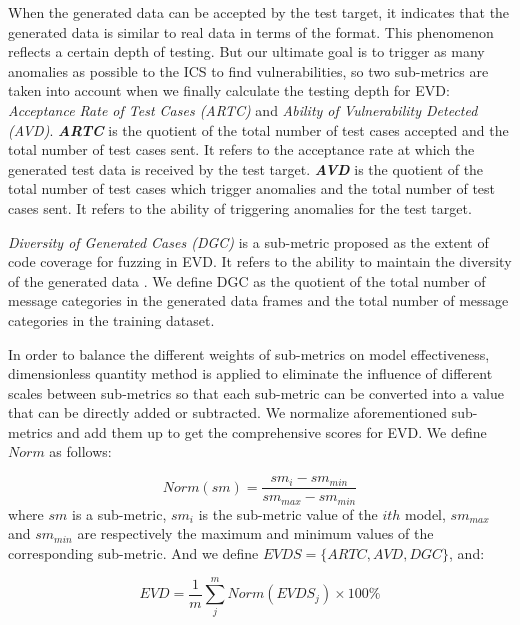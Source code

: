 When the generated data can be accepted by the test target, it indicates that the generated data is similar to real data in terms of the format. This phenomenon reflects a certain depth of testing. But our ultimate goal is to trigger as many anomalies as possible to the ICS to find vulnerabilities, so two sub-metrics are taken into account when we finally calculate the testing depth for EVD: \textit{Acceptance Rate of Test Cases (ARTC)} and \textit{Ability of Vulnerability Detected (AVD)}. \textit{\textbf{ARTC}} is the quotient of the total number of test cases accepted and the total number of test cases sent. It refers to the acceptance rate at which the generated test data is received by the test target. \textit{\textbf{AVD}} is the quotient of the total number of test cases which trigger anomalies and the total number of test cases sent. It refers to the ability of triggering anomalies for the test target. 

\textit{Diversity of Generated Cases (DGC)} is a sub-metric proposed as the extent of code coverage for fuzzing in EVD. It refers to the ability to maintain the diversity of the generated data \cite{mondal2015exploring}. We define DGC as the quotient of the total number of message categories in the generated data frames and the total number of message categories in the training dataset.%

In order to balance the different weights of sub-metrics on model effectiveness, dimensionless quantity method is applied to eliminate the influence of different scales between sub-metrics so that each sub-metric can be converted into a value that can be directly added or subtracted. We normalize aforementioned sub-metrics and add them up to get the comprehensive scores for EVD. We define $Norm$ as follows:

\begin{equation}
Norm(sm) = \frac{sm_i - sm_{min}}{sm_{max}-sm_{min}}
\end{equation}
where $sm$ is a sub-metric, $sm_i$ is the sub-metric value of the $ith$ model, ${{sm}_{max}}$ and ${{sm}_{min}}$ are respectively the maximum and minimum values of the corresponding sub-metric. And we define $EVDS=\{ARTC, AVD, DGC\}$, and:

\begin{equation}
EVD = \frac{1}{m}\sum_{j}^{m}Norm(EVDS_j)\times100\%
\end{equation}


